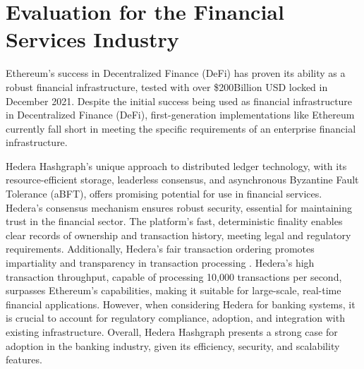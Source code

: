 \documentclass[
	a4paper, %
	10pt, %
	unnumberedsections, %
	twoside, %
]{LTJournalArticle}
\begin{document}
\section{Evaluation for the Financial Services Industry}
Ethereum’s success in Decentralized Finance (DeFi) has proven its ability as a robust financial infrastructure, tested with over \$200Billion USD locked in December 2021.
Despite the initial success being used as financial infrastructure in Decentralized Finance (DeFi), first-generation implementations like Ethereum currently fall short in meeting the specific requirements of an enterprise financial infrastructure. 

Hedera Hashgraph's unique approach to distributed ledger technology, with its resource-efficient storage, leaderless consensus, and asynchronous Byzantine Fault Tolerance (aBFT), offers promising potential for use in financial services. Hedera's consensus mechanism ensures robust security, essential for maintaining trust in the financial sector. The platform's fast, deterministic finality enables clear records of ownership and transaction history, meeting legal and regulatory requirements. Additionally, Hedera's fair transaction ordering promotes impartiality and transparency in transaction processing \cite{baird_swirlds_nodate}.
Hedera's high transaction throughput, capable of processing 10,000 transactions per second, surpasses Ethereum's capabilities, making it suitable for large-scale, real-time financial applications. However, when considering Hedera for banking systems, it is crucial to account for regulatory compliance, adoption, and integration with existing infrastructure. Overall, Hedera Hashgraph presents a strong case for adoption in the banking industry, given its efficiency, security, and scalability features.

\printbibliography %

\end{document}

